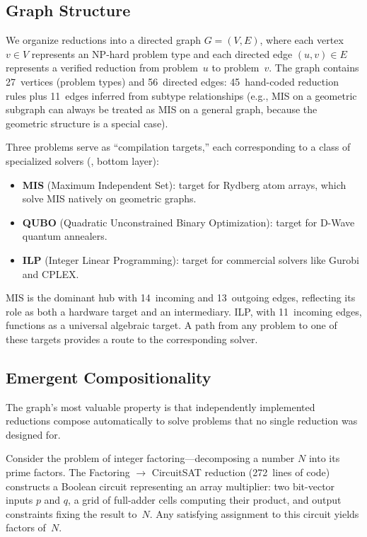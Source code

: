 \documentclass[conference]{IEEEtran}
\begin{document}
\subsection{Graph Structure}\label{sec:graph-structure}

We organize reductions into a directed graph $G = (V, E)$, where each vertex $v \in V$ represents an NP-hard problem type and each directed edge $(u, v) \in E$ represents a verified reduction from problem~$u$ to problem~$v$.
The graph contains 27~vertices (problem types) and 56~directed edges: 45~hand-coded reduction rules plus 11~edges inferred from subtype relationships (e.g., MIS on a geometric subgraph can always be treated as MIS on a general graph, because the geometric structure is a special case).

Three problems serve as ``compilation targets,'' each corresponding to a class of specialized solvers (, bottom layer):
\begin{itemize}
  \item \textbf{MIS} (Maximum Independent Set): target for Rydberg atom arrays, which solve MIS natively on geometric graphs.
  \item \textbf{QUBO} (Quadratic Unconstrained Binary Optimization): target for D-Wave quantum annealers.
  \item \textbf{ILP} (Integer Linear Programming): target for commercial solvers like Gurobi and CPLEX.
\end{itemize}
MIS is the dominant hub with 14~incoming and 13~outgoing edges, reflecting its role as both a hardware target and an intermediary.
ILP, with 11~incoming edges, functions as a universal algebraic target.
A path from any problem to one of these targets provides a route to the corresponding solver.

\subsection{Emergent Compositionality}\label{sec:compositionality}

The graph's most valuable property is that independently implemented reductions compose automatically to solve problems that no single reduction was designed for.

Consider the problem of integer factoring---decomposing a number $N$ into its prime factors.
The Factoring $\to$ CircuitSAT reduction (272~lines of code) constructs a Boolean circuit representing an array multiplier: two bit-vector inputs $p$ and $q$, a grid of full-adder cells computing their product, and output constraints fixing the result to~$N$.
Any satisfying assignment to this circuit yields factors of~$N$.
\end{document}
